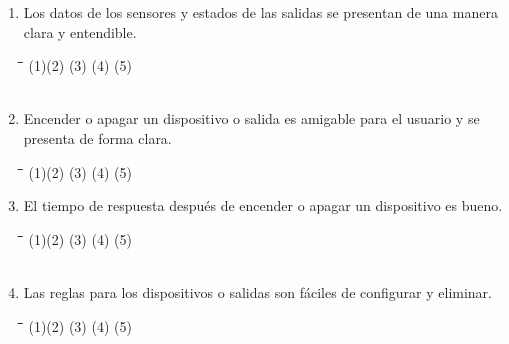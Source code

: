 \documentclass[]{proc}
\begin{document}
\begin{enumerate}
	\item Los datos de los sensores y estados de las salidas se presentan de una manera clara y entendible.
	
	\begin{tabbing}
		\hspace{1cm}\=\hspace{1cm}\=\hspace{1cm}\=\hspace{1cm}\=\kill
		(1)\>(2)  \>(3)  \>(4)  \>(5) \\\\
	\end{tabbing} 
	
	\item Encender o apagar un dispositivo o salida es amigable para el usuario y se presenta de forma clara.
	
	\begin{tabbing}
		\hspace{1cm}\=\hspace{1cm}\=\hspace{1cm}\=\hspace{1cm}\=\kill
		(1)\>(2)  \>(3)  \>(4)  \>(5) \\
	\end{tabbing} 

	\item El tiempo de respuesta después de encender o apagar un dispositivo es bueno.
	
	\begin{tabbing}
		\hspace{1cm}\=\hspace{1cm}\=\hspace{1cm}\=\hspace{1cm}\=\kill
		(1)\>(2)  \>(3)  \>(4)  \>(5) \\\\
	\end{tabbing} 
	
	\item Las reglas para los dispositivos o salidas son fáciles de configurar y eliminar.
	
	\begin{tabbing}
		\hspace{1cm}\=\hspace{1cm}\=\hspace{1cm}\=\hspace{1cm}\=\kill
		(1)\>(2)  \>(3)  \>(4)  \>(5) \\\\
	\end{tabbing} 
	

\end{enumerate}
\end{document}
